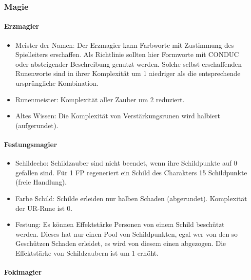 \documentclass{article}
\begin{document}
\subsubsection{Magie}

\paragraph{Erzmagier }

\begin{itemize}
\item Meister der Namen: Der Erzmagier kann Farbworte mit Zustimmung des Spielleiters erschaffen. Als Richtlinie sollten hier Formworte mit CONDUC oder absteigender Beschreibung genutzt werden. Solche selbst erschaffenden Runenworte sind in ihrer Komplexität um 1 niedriger als die entsprechende ursprüngliche Kombination.
\item Runenmeister: Komplexität aller Zauber um 2 reduziert.
\item Altes Wissen: Die Komplexität von Verstärkungsrunen wird halbiert (aufgerundet).
\end{itemize}

\paragraph{Festungsmagier}

\begin{itemize}
\item Schildecho: Schildzauber sind nicht beendet, wenn ihre Schildpunkte auf 0 gefallen sind. Für 1 FP regeneriert ein Schild des Charakters 15 Schildpunkte (freie Handlung).
\item Farbe Schild: Schilde erleiden nur halben Schaden (abgerundet). Komplexität der UR-Rune ist 0.
\item Festung: Es können Effektstärke Personen von einem Schild beschützt werden. Dieses hat nur einen Pool von Schildpunkten, egal wer von den so Geschützen Schaden erleidet, es wird von diesem einen abgezogen. Die Effektstärke von Schildzaubern ist um 1 erhöht.
\end{itemize}

\paragraph{Fokimagier}
\end{document}
